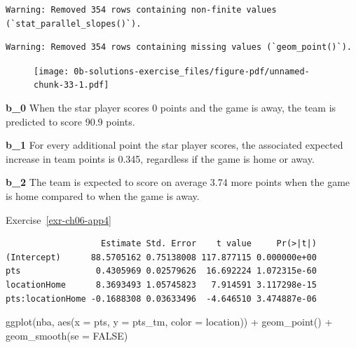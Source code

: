 \documentclass[
  letterpaper,
  DIV=11,
  numbers=noendperiod]{scrreprt}
\newenvironment{Shaded}{\begin{snugshade}}{\end{snugshade}}
\newcommand{\AttributeTok}[1]{\textcolor[rgb]{0.40,0.45,0.13}{#1}}
\newcommand{\ConstantTok}[1]{\textcolor[rgb]{0.56,0.35,0.01}{#1}}
\newcommand{\FunctionTok}[1]{\textcolor[rgb]{0.28,0.35,0.67}{#1}}
\newcommand{\NormalTok}[1]{\textcolor[rgb]{0.00,0.23,0.31}{#1}}
\newcommand{\OtherTok}[1]{\textcolor[rgb]{0.00,0.23,0.31}{#1}}
\newcommand{\SpecialCharTok}[1]{\textcolor[rgb]{0.37,0.37,0.37}{#1}}
\theoremstyle{definition}
\theoremstyle{remark}
\begin{document}
\begin{verbatim}
Warning: Removed 354 rows containing non-finite values
(`stat_parallel_slopes()`).
\end{verbatim}

\begin{verbatim}
Warning: Removed 354 rows containing missing values (`geom_point()`).
\end{verbatim}

\begin{figure}[H]

{\centering \texttt{[image: 0b-solutions-exercise\_files/figure-pdf/unnamed-chunk-33-1.pdf]}

}

\end{figure}

\textbf{b\_0} When the star player scores 0 points and the game is away,
the team is predicted to score 90.9 points.

\textbf{b\_1} For every additional point the star player scores, the
associated expected increase in team points is 0.345, regardless if the
game is home or away.

\textbf{b\_2} The team is expected to score on average 3.74 more points
when the game is home compared to when the game is away.

Exercise~\ref{exr-ch06-app4}

\begin{Shaded}
\end{Shaded}

\begin{verbatim}
                   Estimate Std. Error    t value     Pr(>|t|)
(Intercept)      88.5705162 0.75138008 117.877115 0.000000e+00
pts               0.4305969 0.02579626  16.692224 1.072315e-60
locationHome      8.3693493 1.05745823   7.914591 3.117298e-15
pts:locationHome -0.1688308 0.03633496  -4.646510 3.474887e-06
\end{verbatim}

\begin{Shaded}
\begin{Highlighting}[]
\FunctionTok{ggplot}\NormalTok{(nba, }\FunctionTok{aes}\NormalTok{(}\AttributeTok{x =}\NormalTok{ pts, }\AttributeTok{y =}\NormalTok{ pts\_tm, }\AttributeTok{color =}\NormalTok{ location)) }\SpecialCharTok{+}
  \FunctionTok{geom\_point}\NormalTok{() }\SpecialCharTok{+}
  \FunctionTok{geom\_smooth}\NormalTok{(}\AttributeTok{se =} \ConstantTok{FALSE}\NormalTok{)}
\end{Highlighting}
\end{Shaded}
\end{document}
